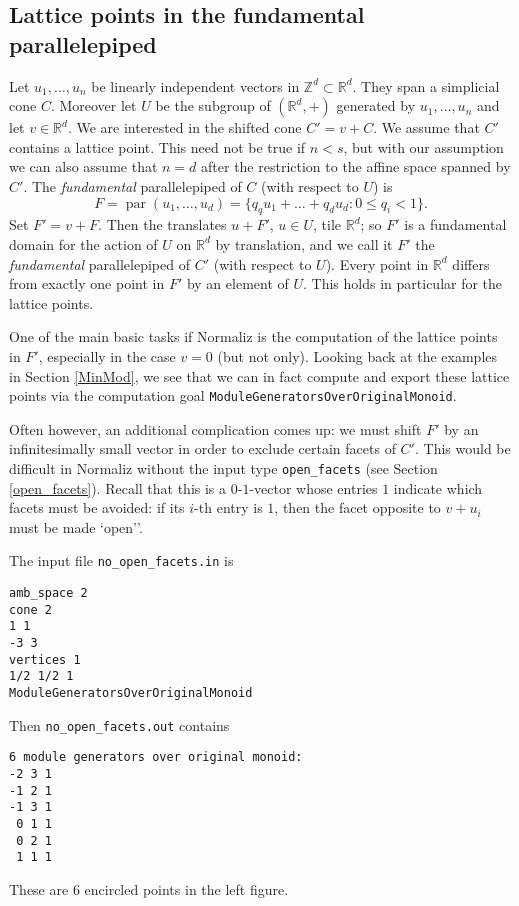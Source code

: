 \documentclass[12pt,a4paper]{scrartcl}
\theoremstyle{definition}
\def\ZZ{{\mathbb Z}}
\def\RR{{\mathbb R}}
\DeclareMathOperator{\para}{par}
\begin{document}
{\subsection{Lattice points in the fundamental parallelepiped}\label{LattPointsFPE}

Let $u_1,\dots,u_n$ be linearly independent vectors in $\ZZ^d\subset\RR^d$. They span a simplicial cone $C$. Moreover let $U$ be the subgroup of $(\RR^d,+)$ generated by $u_1,\dots,u_n$ and let $v\in\RR^d$. We are interested in the shifted cone $C'=v+C$. We assume that $C'$ contains a lattice point. This need not be true if $n<s$, but with our assumption we can also assume that $n=d$ after the restriction to the affine space spanned by $C'$. The \emph{fundamental} parallelepiped of $C$ (with respect to $U$) is
$$
F=\para(u_1,\dots,u_d)=\{q_qu_1+\dots+q_du_d: 0\le q_i<1  \}.
$$
Set $F'=v+F$. Then the translates $u+F'$, $u\in U$, tile $\RR^d$; so $F'$ is a fundamental domain for the action of $U$ on $\RR^d$ by translation, and we call it $F'$ the \emph{fundamental} parallelepiped of $C'$  (with respect to $U$). Every point in $\RR^d$ differs from exactly one point in $F'$ by an element of $U$. This holds in particular for the lattice points.

One of the main basic tasks if Normaliz is the computation of the lattice points in $F'$, especially in the case $v=0$ (but not only). Looking back at the examples in Section \ref{MinMod}, we see that we can in fact compute and export these lattice points via the computation goal \verb|ModuleGeneratorsOverOriginalMonoid|. 

Often however, an additional complication comes up: we  must shift $F'$ by an infinitesimally small vector in order to exclude certain facets of $C'$. This would be difficult in Normaliz without the input type \verb|open_facets| (see Section \ref{open_facets}). Recall that this is a $0$-$1$-vector whose entries $1$ indicate which facets must be avoided: if its $i$-th entry is $1$, then the facet opposite to $v+u_i$ must be made `open''.

The input file \verb|no_open_facets.in| is
\begin{Verbatim}
amb_space 2
cone 2
1 1
-3 3
vertices 1
1/2 1/2 1
ModuleGeneratorsOverOriginalMonoid
\end{Verbatim}

Then \verb|no_open_facets.out| contains
\begin{Verbatim}
6 module generators over original monoid:
-2 3 1
-1 2 1
-1 3 1
 0 1 1
 0 2 1
 1 1 1
\end{Verbatim}
These are $6$ encircled points in the left figure.

}
\end{document}
